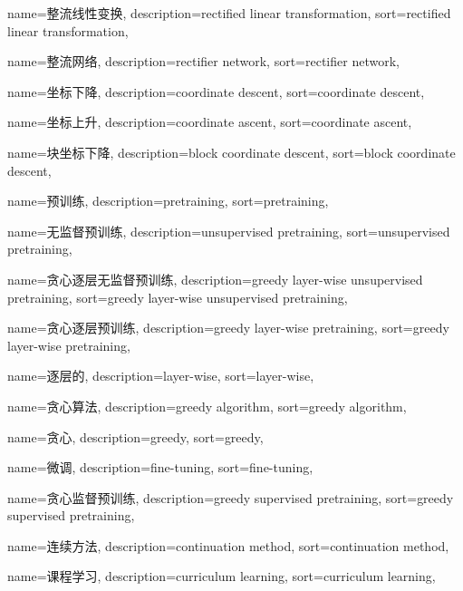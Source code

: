{
  name=整流线性变换,
  description={rectified linear transformation},
  sort={rectified linear transformation},
}

{
  name=整流网络,
  description={rectifier network},
  sort={rectifier network},
}

{
  name=坐标下降,
  description={coordinate descent},
  sort={coordinate descent},
}

{
  name=坐标上升,
  description={coordinate ascent},
  sort={coordinate ascent},
}

{
  name=块坐标下降,
  description={block coordinate descent},
  sort={block coordinate descent},
}

{
  name=预训练,
  description={pretraining},
  sort={pretraining},
}

{
  name=无监督预训练,
  description={unsupervised pretraining},
  sort={unsupervised pretraining},
}

{
  name=贪心逐层无监督预训练,
  description={greedy layer-wise unsupervised pretraining},
  sort={greedy layer-wise unsupervised pretraining},
}

{
  name=贪心逐层预训练,
  description={greedy layer-wise pretraining},
  sort={greedy layer-wise pretraining},
}

{
  name=逐层的,
  description={layer-wise},
  sort={layer-wise},
}

{
  name=贪心算法,
  description={greedy algorithm},
  sort={greedy algorithm},
}

{
  name=贪心,
  description={greedy},
  sort={greedy},
}

{
  name=微调,
  description={fine-tuning},
  sort={fine-tuning},
}

{
  name=贪心监督预训练,
  description={greedy supervised pretraining},
  sort={greedy supervised pretraining},
}

{
  name=连续方法,
  description={continuation method},
  sort={continuation method},
}

{
  name=课程学习,
  description={curriculum learning},
  sort={curriculum learning},
}

